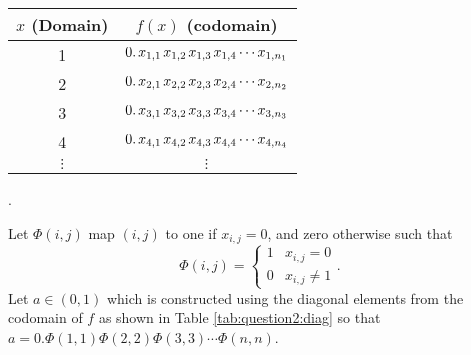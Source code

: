 \documentclass{article}
\begin{document}
\begin{center}\begin{tabular}{c|c}
	$x$ (Domain) & $f(x)$ (codomain) \\ \hline
	1 & $ 0.\hspace{0.02in} x_{1,1} \hspace{0.02in} x_{1,2} \hspace{0.02in} x_{1,3}\hspace{0.02in}x_{1,4}\cdots x_{1,n_1}$ \\
	2 & $ 0.\hspace{0.02in} x_{2,1} \hspace{0.02in} x_{2,2} \hspace{0.02in} x_{2,3}\hspace{0.02in}x_{2,4}\cdots x_{2,n_2}$ \\
	3 & $ 0.\hspace{0.02in} x_{3,1} \hspace{0.02in} x_{3,2} \hspace{0.02in} x_{3,3}\hspace{0.02in}x_{3,4}\cdots x_{3,n_3}$ \\
	4 & $ 0.\hspace{0.02in} x_{4,1} \hspace{0.02in} x_{4,2} \hspace{0.02in} x_{4,3}\hspace{0.02in}x_{4,4}\cdots x_{4,n_4}$ \\
	$\vdots$ & $\vdots$ \\
\end{tabular}.\end{center}
Let $\Phi(i,j)$ map $(i,j)$ to one if $x_{i,j} = 0$, and zero otherwise such that 
\begin{equation*}
	\Phi(i,j) = \begin{cases} 1 & x_{i,j} = 0 \\ 0 & x_{i,j} \ne 1 \end{cases}.
\end{equation*}
Let $a\in (0,1)$ which is constructed using the diagonal elements from the codomain of $f$ as shown in Table \ref{tab:question2:diag} so that $a = 0.\Phi(1,1)\Phi(2,2)\Phi(3,3)\cdots\Phi(n,n)$. 
\end{document}

